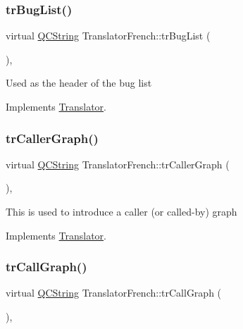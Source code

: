 \subsubsection{\texorpdfstring{trBugList()}{trBugList()}}
{\footnotesize\ttfamily virtual \mbox{\hyperlink{class_q_c_string}{Q\+C\+String}} Translator\+French\+::tr\+Bug\+List (\begin{DoxyParamCaption}{ }\end{DoxyParamCaption})\hspace{0.3cm}{\ttfamily [inline]}, {\ttfamily [virtual]}}

Used as the header of the bug list 

Implements \mbox{\hyperlink{class_translator}{Translator}}.

\mbox{\label{class_translator_french_abfed579188c63fec8e6cfe66d8212bd0}} 
\subsubsection{\texorpdfstring{trCallerGraph()}{trCallerGraph()}}
{\footnotesize\ttfamily virtual \mbox{\hyperlink{class_q_c_string}{Q\+C\+String}} Translator\+French\+::tr\+Caller\+Graph (\begin{DoxyParamCaption}{ }\end{DoxyParamCaption})\hspace{0.3cm}{\ttfamily [inline]}, {\ttfamily [virtual]}}

This is used to introduce a caller (or called-\/by) graph 

Implements \mbox{\hyperlink{class_translator}{Translator}}.

\mbox{\label{class_translator_french_a90f185e3b5e40e07fa6f4daf7c311f79}} 
\subsubsection{\texorpdfstring{trCallGraph()}{trCallGraph()}}
{\footnotesize\ttfamily virtual \mbox{\hyperlink{class_q_c_string}{Q\+C\+String}} Translator\+French\+::tr\+Call\+Graph (\begin{DoxyParamCaption}{ }\end{DoxyParamCaption})\hspace{0.3cm}{\ttfamily [inline]}, {\ttfamily [virtual]}}

